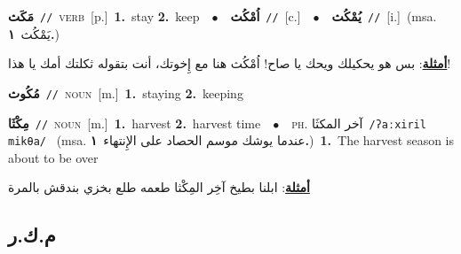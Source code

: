\documentclass[10pt,a4paper,twoside]{article} %
\begin{document}
\begin{multicols}{2}
{\setlength\topsep{0pt}\textbf{\foreignlanguage{arabic}{مَكَث}}\ {\color{gray}\texttt{//}\color{black}}\ \textsc{verb}\ [p.]\ \textbf{1.}~stay  \textbf{2.}~keep\ \ $\bullet$\ \ \setlength\topsep{0pt}\textbf{\foreignlanguage{arabic}{اُمْكُث}}\ {\color{gray}\texttt{//}\color{black}}\ [c.]\ \ $\bullet$\ \ \setlength\topsep{0pt}\textbf{\foreignlanguage{arabic}{يُمْكُث}}\ {\color{gray}\texttt{//}\color{black}}\ [i.]\ \color{gray}(msa. \foreignlanguage{arabic}{يَمْكُث}~\foreignlanguage{arabic}{\textbf{١.}})\color{black}\  \begin{flushright}\color{gray}\foreignlanguage{arabic}{\textbf{\underline{\foreignlanguage{arabic}{أمثلة}}}: بس هو يحكيلك ويحك يا صاح! اُمْكُث هنا مع إِخوتك، أنت بتقوله ثكلتك أمك يا هذا!}\end{flushright}\color{black}} \vspace{2mm}

{\setlength\topsep{0pt}\textbf{\foreignlanguage{arabic}{مُكُوث}}\ {\color{gray}\texttt{//}\color{black}}\ \textsc{noun}\ [m.]\ \textbf{1.}~staying  \textbf{2.}~keeping\ } \vspace{2mm}

{\setlength\topsep{0pt}\textbf{\foreignlanguage{arabic}{مِكْثَا}}\ {\color{gray}\texttt{//}\color{black}}\ \textsc{noun}\ [m.]\ \textbf{1.}~harvest  \textbf{2.}~harvest time\ \ $\bullet$\ \ \textsc{ph.} \color{gray} \foreignlanguage{arabic}{آخر المكثَا}\color{black}\ {\color{gray}\texttt{/{\sffamily ʔaːxiril mikθa}/}\color{black}}\ \color{gray} (msa. \foreignlanguage{arabic}{عندما يوشك موسم الحصاد على الإِنتهاء}~\foreignlanguage{arabic}{\textbf{١.}})\color{black}\ \textbf{1.}~The harvest season is about to be over\  \begin{flushright}\color{gray}\foreignlanguage{arabic}{\textbf{\underline{\foreignlanguage{arabic}{أمثلة}}}: ابلنا بطيخ آخِر المِكْثا طعمه طلع بخزي بندقش بالمرة}\end{flushright}\color{black}} \vspace{2mm}

\vspace{-3mm}
\subsection*{\color{blue}\foreignlanguage{arabic}{م.ك.ر}\color{blue}{}} 


\end{multicols}
\end{document}
